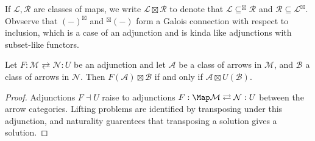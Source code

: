  \begin{notation}\label{2.1.4}
	 If $\mathcal{L} ,\mathcal{R} $ are classes of maps, we write $\mathcal{L} \boxtimes \mathcal{R} $ to denote that $\mathcal{L} \subseteq ^{\boxtimes} \mathcal{R} $ and $\mathcal{R} \subseteq \mathcal{L} ^{\boxtimes} $. Obvserve that $(-)^{\boxtimes} $ and ${}^{\boxtimes} (-)$ form a Galois connection with respect to inclusion, which is a case of an adjunction and is kinda like adjunctions with subset-like functors.
 \end{notation}
 
 \begin{lemma}\label{2.1.5}
 	Let $F : \mathcal{M}  \rightleftarrows \mathcal{N}  : U$ be an adjunction and let $\mathcal{A} $ be a class of arrows in $\mathcal{M} $, and $\mathcal{B} $ a class of arrows in $\mathcal{N} $. Then $F(\mathcal{A} )\boxtimes \mathcal{B} $ if and only if $\mathcal{A} \boxtimes U(\mathcal{B} )$.
 \end{lemma}
 \begin{proof}
 	Adjunctions $F\dashv U$ raise to adjunctions $F : \Map \mathcal{M} \rightleftarrows \mathcal{N} : U$ between the arrow categories. Lifting problems are identified by transposing under this adjunction, and naturality guarentees that transposing a solution gives a solution.
 \end{proof}
 
